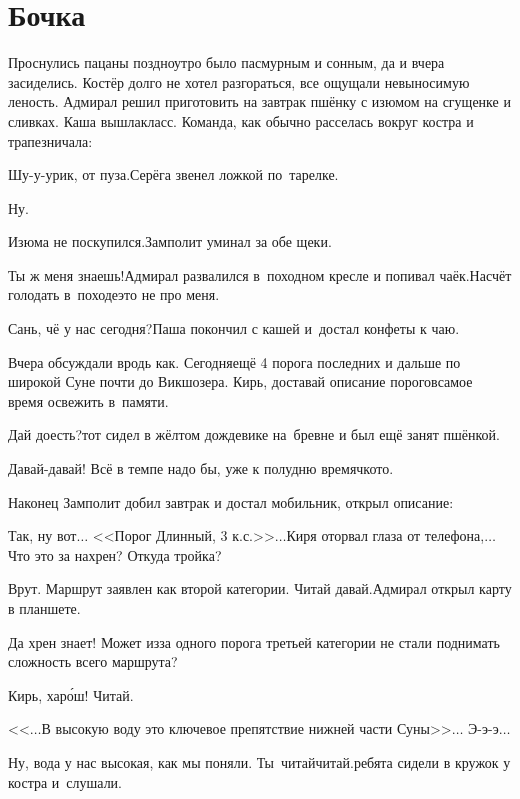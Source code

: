 \chapter{Бочка}
\vepsianrose

Проснулись пацаны поздно\mdash утро было пасмурным и сонным, да и вчера засиделись. Костёр долго не хотел разгораться, все ощущали невыносимую леность. Адмирал решил приготовить на завтрак пшёнку с изюмом на сгущенке и сливках. Каша вышла\mdash класс. Команда, как обычно расселась вокруг костра и трапезничала:

\diagdash Шу-у-урик, от пуза.\mdash Серёга звенел ложкой по~тарелке.

\diagdash Ну.

\diagdash Изюма не поскупился.\mdash Замполит уминал за обе щеки.

\diagdash Ты ж меня знаешь!\mdash Адмирал развалился в~походном кресле и попивал чаёк.\mdash Насчёт голодать в~походе\mdash это не про меня.

\diagdash Сань, чё у нас сегодня?\mdash Паша покончил с кашей и~достал конфеты к чаю.

\diagdash Вчера обсуждали вродь как. Сегодня\mdash ещё 4 порога последних и дальше по широкой Суне почти до Викшозера. Кирь, доставай описание порогов\mdash самое время освежить в~памяти.

\diagdash Дай доесть?\mdash тот сидел в жёлтом дождевике на~бревне и был ещё занят пшёнкой.

\diagdash Давай-давай! Всё в темпе надо бы, уже к полудню времячко\sdash то.

Наконец Замполит добил завтрак и достал мобильник, открыл описание:

\diagdash Так, ну вот$\ldots$ <<Порог Длинный, 3 к.с.>>$\ldots$\mdash Киря оторвал глаза от телефона,\mdash $\ldots$Что это за нахрен? Откуда тройка?

\diagdash Врут. Маршрут заявлен как второй категории. Читай давай.\mdash Адмирал открыл карту в планшете.

\diagdash Да хрен знает! Может из\sdash за одного порога третьей категории не стали поднимать сложность всего маршрута? 

\diagdash Кирь, хар\'ош! Читай.

\diagdash <<$\ldots$В высокую воду это ключевое препятствие нижней части Суны>>$\ldots$ Э-э-э$\ldots$ %

\diagdash Ну, вода у нас высокая, как мы поняли. Ты~читай\sdash читай.\mdash ребята сидели в кружок у костра и~слушали.

